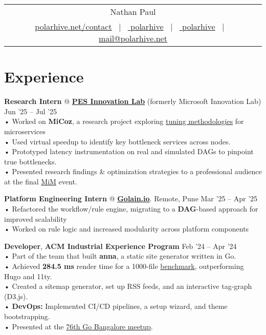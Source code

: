 \documentclass[a4,12pt]{article}
\begin{document}
\begin{tabularx}{\linewidth}{@{}C@{}}
\Huge{Nathan Paul} \\[10pt]
\href{https://polarhive.net}{ polarhive.net/contact} \ $|$ \
\href{https://github.com/polarhive}{ polarhive} \ $|$ \
\href{https://linkedin.com/in/polarhive}{ polarhive} \ $|$ \
\href{https://polarhive.net/email}{ mail@polarhive.net}
\end{tabularx}

\section{Experience}

\textbf{Research Intern} @ \textbf{\href{https://theinnovationlab.in/projects?project=MiCoz}{PES Innovation Lab}} (formerly Microsoft Innovation Lab) \hfill Jun '25 – Jul '25 \\
• Worked on \textbf{MiCoz}, a research project exploring \href{https://dl.acm.org/doi/10.1145/2815400.2815409}{tuning methodologies} for microservices\\
• Used virtual speedup to identify key bottleneck services across nodes. \\
• Prototyped latency instrumentation on real and simulated DAGs to pinpoint true bottlenecks. \\
• Presented research findings \& optimization strategies to a professional audience at the final \href{https://www.linkedin.com/posts/polarhive_research-internship-theinnovationlab-activity-7366541471715368961-em_T}{MiM} event.

\textbf{Platform Engineering Intern} @ \textbf{\href{https://golain.io}{Golain.io}}. Remote, Pune \hfill Mar '25 – Apr '25 \\
• Refactored the workflow/rule engine, migrating to a \textbf{DAG}-based approach for improved scalability \\
• Worked on rule logic and increased modularity across platform components

\textbf{Developer}, \textbf{ACM Industrial Experience Program} \hfill Feb '24 – Apr '24 \\
• Part of the team that built \textbf{anna}, a static site generator written in Go. \\
• Achieved \textbf{284.5 ms} render time for a 1000-file \href{https://github.com/anna-ssg/anna/actions}{benchmark}, outperforming Hugo and 11ty. \\
• Created a sitemap generator, set up RSS feeds, and an interactive tag-graph (D3.js). \\
• \textbf{DevOps:} Implemented CI/CD pipelines, a setup wizard, and theme bootstrapping. \\
• Presented at the \href{https://www.meetup.com/golang-bangalore/events/301697429/}{76th Go Bangalore meetup}.
\end{document}
